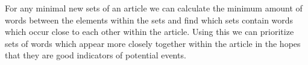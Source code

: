 For any minimal new sets of an article we can calculate the minimum amount of words between the elements within the sets and find which sets contain words which occur close to each other within the article. Using this we can prioritize sets of words which appear more closely together within the article in the hopes that they are good indicators of potential events.
